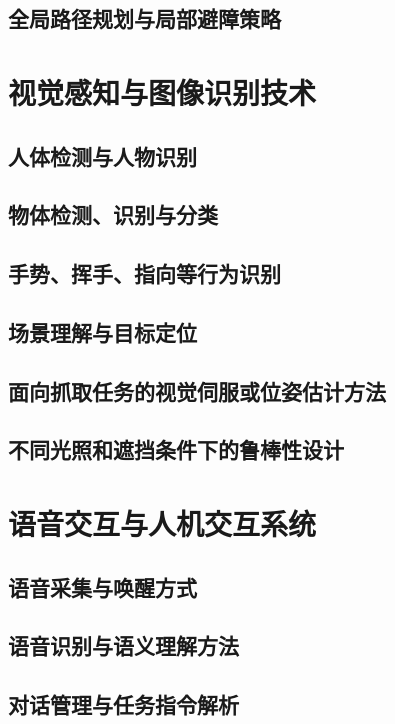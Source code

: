 \documentclass[12pt,hyperref,a4paper,UTF8]{ctexart}
\begin{document}
\subsection{全局路径规划与局部避障策略}

\section{视觉感知与图像识别技术}
\subsection{人体检测与人物识别}

\subsection{物体检测、识别与分类}

\subsection{手势、挥手、指向等行为识别}

\subsection{场景理解与目标定位}

\subsection{面向抓取任务的视觉伺服或位姿估计方法}

\subsection{不同光照和遮挡条件下的鲁棒性设计}

\section{语音交互与人机交互系统}
\subsection{语音采集与唤醒方式}

\subsection{语音识别与语义理解方法}

\subsection{对话管理与任务指令解析}


\end{document}
